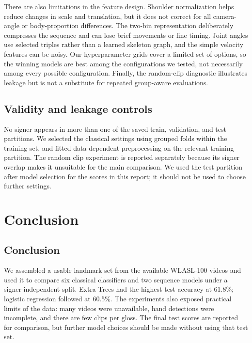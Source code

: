 \documentclass[12pt,a4paper,oneside]{report}
\begin{document}
There are also limitations in the feature design. Shoulder normalization helps reduce changes in scale and translation, but it does not correct for all camera-angle or body-proportion differences. The two-bin representation deliberately compresses the sequence and can lose brief movements or fine timing. Joint angles use selected triples rather than a learned skeleton graph, and the simple velocity features can be noisy. Our hyperparameter grids cover a limited set of options, so the winning models are best among the configurations we tested, not necessarily among every possible configuration. Finally, the random-clip diagnostic illustrates leakage but is not a substitute for repeated group-aware evaluations.

\section{Validity and leakage controls}
No signer appears in more than one of the saved train, validation, and test partitions. We selected the classical settings using grouped folds within the training set, and fitted data-dependent preprocessing on the relevant training partition. The random clip experiment is reported separately because its signer overlap makes it unsuitable for the main comparison. We used the test partition after model selection for the scores in this report; it should not be used to choose further settings.

\chapter{Conclusion}
\section{Conclusion}
We assembled a usable landmark set from the available WLASL-100 videos and used it to compare six classical classifiers and two sequence models under a signer-independent split. Extra Trees had the highest test accuracy at 61.8\%; logistic regression followed at 60.5\%. The experiments also exposed practical limits of the data: many videos were unavailable, hand detections were incomplete, and there are few clips per gloss. The final test scores are reported for comparison, but further model choices should be made without using that test set.
\end{document}
